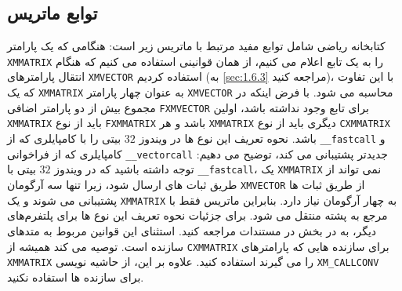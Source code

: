 \textbf{\vspace{-60pt}}
\subsection{\textbf{توابع ماتریس}}
\label{subsec:2.8.2}
{
    \Large
    \begin{spacing}{1.5}
        کتابخانه ریاضی  شامل توابع مفید مرتبط با ماتریس زیر است:
        \textbf{\vspace{6pt}}
        \lr{}
        \textbf{\vspace{6pt}}
        هنگامی که یک پارامتر \texttt{XMMATRIX} را به یک تابع اعلام می کنیم، از همان قوانینی استفاده می کنیم که هنگام انتقال پارامترهای \texttt{XMVECTOR} استفاده کردیم
        (به \ref{sec:1.6.3} مراجعه کنید)،
        با این تفاوت که یک \texttt{XMMATRIX} به عنوان چهار پارامتر \texttt{XMVECTOR} محاسبه می شود.
        با فرض اینکه در مجموع بیش از دو پارامتر اضافی \texttt{FXMVECTOR} برای تابع وجود نداشته باشد،
        اولین \texttt{XMMATRIX} باید از نوع \texttt{FXMMATRIX} باشد و هر \texttt{XMMATRIX} دیگری باید از نوع \texttt{CXMMATRIX} باشد.
        نحوه تعریف این نوع ها در ویندوز $32$ بیتی را با کامپایلری که از \texttt{\_\_fastcall}
        و کامپایلری که از فراخوانی \texttt{\_\_vectorcall} جدیدتر پشتیبانی می کند، توضیح می دهیم:
        \textbf{\vspace{3pt}}
        \lr{}
        \textbf{\vspace{6pt}}
        توجه داشته باشید که در ویندوز $32$ بیتی با \texttt{\_\_fastcall}، یک \texttt{XMMATRIX} نمی تواند از طریق ثبات های  ارسال شود،
        زیرا تنها سه آرگومان \texttt{XMVECTOR} از طریق ثبات ها پشتیبانی می شوند و یک \texttt{XMMATRIX} به چهار آرگومان نیاز دارد.
        بنابراین ماتریس فقط با مرجع به پشته منتقل می شود.
        برای جزئیات نحوه تعریف این نوع ها برای پلتفرم‌های دیگر، به  در بخش  در مستندات  مراجعه کنید.
        استثنای این قوانین مربوط به متدهای سازنده است.
         توصیه می کند همیشه از \texttt{CXMMATRIX} برای سازنده هایی که پارامترهای \texttt{XMMATRIX} را می گیرند استفاده کنید.
        علاوه بر این، از حاشیه نویسی \texttt{XM\_CALLCONV} برای سازنده ها استفاده نکنید.
    \end{spacing}
}

